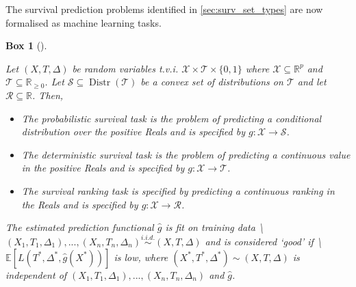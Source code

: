 \documentclass[
  letterpaper,
]{scrbook}
\providecommand{\tightlist}{%
  \setlength{\itemsep}{0pt}\setlength{\parskip}{0pt}}\usepackage{longtable,booktabs,array}
\theoremstyle{plain}
\newtheorem{conjecture}{Box}[chapter]
\theoremstyle{definition}
\theoremstyle{remark}
\begin{document}
The survival prediction problems identified in \ref{sec:surv_set_types}
are now formalised as machine learning tasks.

\begin{tcolorbox}[enhanced jigsaw, titlerule=0mm, bottomrule=.15mm, left=2mm, leftrule=.75mm, rightrule=.15mm, colbacktitle=quarto-callout-note-color!10!white, bottomtitle=1mm, opacitybacktitle=0.6, title={Survival Task}, breakable, arc=.35mm, coltitle=black, toprule=.15mm, colframe=quarto-callout-note-color-frame, opacityback=0, toptitle=1mm, colback=white]

\leavevmode{}%
\begin{conjecture}[]\label{cnj-task-surv}

Let \((X,T,\Delta)\) be random variables t.v.i.
\(\mathcal{X}\times \mathcal{T}\times \{0,1\}\) where
\(\mathcal{X}\subseteq \mathbb{R}^p\) and
\(\mathcal{T}\subseteq \mathbb{R}_{\geq 0}\). Let
\(\mathcal{S}\subseteq \ensuremath{\operatorname{Distr}(\mathcal{T})}\)
be a convex set of distributions on \(\mathcal{T}\) and let
\(\mathcal{R}\subseteq \mathbb{R}\). Then,

\begin{itemize}
\tightlist
\item
  The \emph{probabilistic survival task} is the problem of predicting a
  conditional distribution over the positive Reals and is specified by
  \(g: \mathcal{X}\rightarrow \mathcal{S}\).
\item
  The \emph{deterministic survival task} is the problem of predicting a
  continuous value in the positive Reals and is specified by
  \(g: \mathcal{X}\rightarrow \mathcal{T}\).
\item
  The \emph{survival ranking task} is specified by predicting a
  continuous ranking in the Reals and is specified by
  \(g: \mathcal{X}\rightarrow \mathcal{R}\).
\end{itemize}

The estimated prediction functional \(\hat{g}\) is fit on training data
\textbackslash{}\((X_1,T_1,\Delta_1),...,(X_n,T_n,\Delta_n) \stackrel{i.i.d.}\sim(X,T,\Delta)\)
and is considered `good' if
\textbackslash{}\(\mathbb{E}[L(T^*, \Delta^*, \hat{g}(X^*))]\) is low,
where \((X^*, T^*, \Delta^*) \sim (X, T, \Delta)\) is independent of
\((X_1,T_1,\Delta_1),...,(X_n,T_n,\Delta_n)\) and \(\hat{g}\).

\end{conjecture}

\end{tcolorbox}
\end{document}
